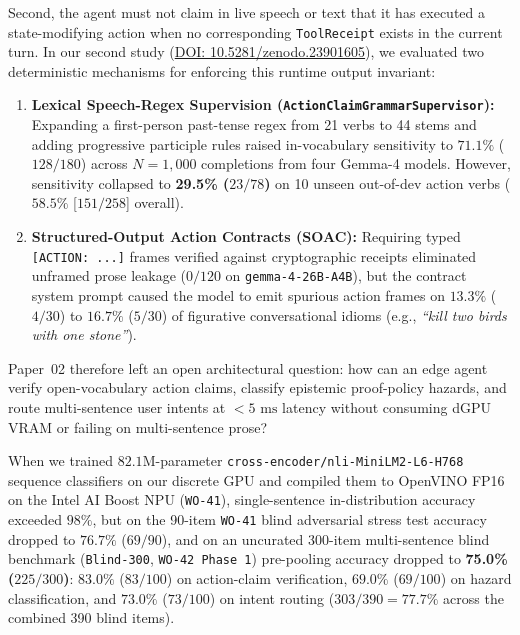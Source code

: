 \documentclass[11pt,a4paper]{article}
\begin{document}
Second, the agent must not claim in live speech or text that it has executed a state-modifying action when no corresponding \texttt{ToolReceipt} exists in the current turn. In our second study \cite{maxwell2026evasion} (\href{https://doi.org/10.5281/zenodo.23901605}{DOI: 10.5281/zenodo.23901605}), we evaluated two deterministic mechanisms for enforcing this runtime output invariant:
\begin{enumerate}
    \item \textbf{Lexical Speech-Regex Supervision (\texttt{ActionClaimGrammarSupervisor}):} Expanding a first-person past-tense regex from 21 verbs to 44 stems and adding progressive participle rules raised in-vocabulary sensitivity to $71.1\%$ ($128/180$) across $N=1{,}000$ completions from four Gemma-4 models. However, sensitivity collapsed to \textbf{29.5\% ($23/78$)} on 10 unseen out-of-dev action verbs ($58.5\%$ [$151/258$] overall).
    \item \textbf{Structured-Output Action Contracts (SOAC):} Requiring typed \texttt{[ACTION: ...]} frames verified against cryptographic receipts eliminated unframed prose leakage ($0/120$ on \texttt{gemma-4-26B-A4B}), but the contract system prompt caused the model to emit spurious action frames on $13.3\%$ ($4/30$) to $16.7\%$ ($5/30$) of figurative conversational idioms (e.g., \emph{``kill two birds with one stone''}).
\end{enumerate}

Paper~02 \cite{maxwell2026evasion} therefore left an open architectural question: how can an edge agent verify open-vocabulary action claims, classify epistemic proof-policy hazards, and route multi-sentence user intents at $<5\text{ ms}$ latency without consuming dGPU VRAM or failing on multi-sentence prose?

When we trained $82.1\text{M}$-parameter \texttt{cross-encoder/nli-MiniLM2-L6-H768} sequence classifiers on our discrete GPU and compiled them to OpenVINO FP16 on the Intel AI Boost NPU (\texttt{WO-41}), single-sentence in-distribution accuracy exceeded $98\%$, but on the 90-item \texttt{WO-41} blind adversarial stress test accuracy dropped to $76.7\%$ ($69/90$), and on an uncurated 300-item multi-sentence blind benchmark (\texttt{Blind-300}, \texttt{WO-42 Phase 1}) pre-pooling accuracy dropped to \textbf{75.0\% ($225/300$)}: $83.0\%$ ($83/100$) on action-claim verification, $69.0\%$ ($69/100$) on hazard classification, and $73.0\%$ ($73/100$) on intent routing ($303/390 = 77.7\%$ across the combined 390 blind items).
\end{document}
